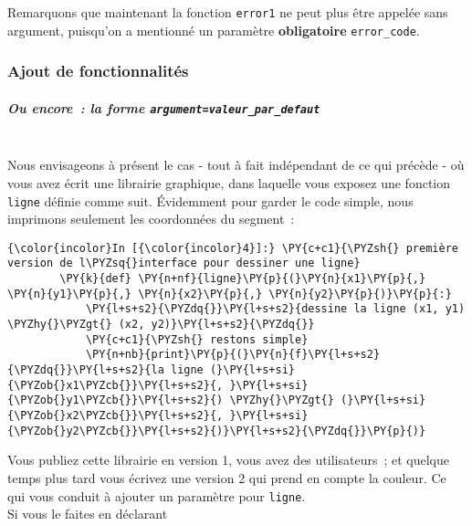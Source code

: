     Remarquons que maintenant la fonction \texttt{error1} ne peut plus être
appelée sans argument, puisqu'on a mentionné un paramètre
\textbf{obligatoire} \texttt{error\_code}.

    \hypertarget{ajout-de-fonctionnalituxe9s}{%
\subsubsection{Ajout de
fonctionnalités}\label{ajout-de-fonctionnalituxe9s}}

    \hypertarget{ou-encore-la-forme-argumentvaleur_par_defaut}{%
\subparagraph{\texorpdfstring{Ou encore~: la forme
\texttt{argument=valeur\_par\_defaut}}{Ou encore~: la forme argument=valeur\_par\_defaut}\\\\}\label{ou-encore-la-forme-argumentvaleur_par_defaut}}

    Nous envisageons à présent le cas - tout à fait indépendant de ce qui
précède - où vous avez écrit une librairie graphique, dans laquelle vous
exposez une fonction \texttt{ligne} définie comme suit. Évidemment pour
garder le code simple, nous imprimons seulement les coordonnées du
segment~:

    \begin{Verbatim}[commandchars=\\\{\}]
{\color{incolor}In [{\color{incolor}4}]:} \PY{c+c1}{\PYZsh{} première version de l\PYZsq{}interface pour dessiner une ligne}
        \PY{k}{def} \PY{n+nf}{ligne}\PY{p}{(}\PY{n}{x1}\PY{p}{,} \PY{n}{y1}\PY{p}{,} \PY{n}{x2}\PY{p}{,} \PY{n}{y2}\PY{p}{)}\PY{p}{:}
            \PY{l+s+s2}{\PYZdq{}}\PY{l+s+s2}{dessine la ligne (x1, y1) \PYZhy{}\PYZgt{} (x2, y2)}\PY{l+s+s2}{\PYZdq{}}
            \PY{c+c1}{\PYZsh{} restons simple}
            \PY{n+nb}{print}\PY{p}{(}\PY{n}{f}\PY{l+s+s2}{\PYZdq{}}\PY{l+s+s2}{la ligne (}\PY{l+s+si}{\PYZob{}x1\PYZcb{}}\PY{l+s+s2}{, }\PY{l+s+si}{\PYZob{}y1\PYZcb{}}\PY{l+s+s2}{) \PYZhy{}\PYZgt{} (}\PY{l+s+si}{\PYZob{}x2\PYZcb{}}\PY{l+s+s2}{, }\PY{l+s+si}{\PYZob{}y2\PYZcb{}}\PY{l+s+s2}{)}\PY{l+s+s2}{\PYZdq{}}\PY{p}{)}
\end{Verbatim}


    Vous publiez cette librairie en version 1, vous avez des utilisateurs~;
et quelque temps plus tard vous écrivez une version 2 qui prend en
compte la couleur. Ce qui vous conduit à ajouter un paramètre pour
\texttt{ligne}.\\

    Si vous le faites en déclarant

